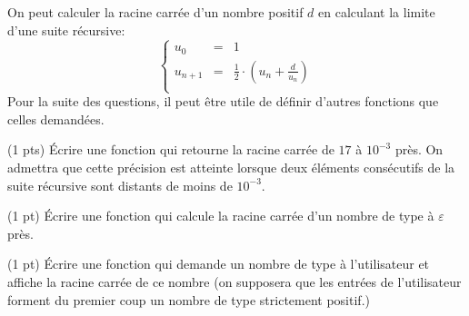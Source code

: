 

On peut calculer la racine carr{\'e}e d'un nombre positif $d$ en calculant
la limite d'une suite r{\'e}cursive:
$$
\left\lbrace
\begin{array}{rcl}
u_0 &=& 1 \\
u_{n+1}&=& \frac 12 \cdot ( u_n + \frac d {u_n} )\\
\end{array}
\right.
$$
Pour la suite des questions, il peut {\^e}tre utile de d{\'e}finir d'autres
fonctions que celles demand{\'e}es.

\question (1 pts) {\'E}crire une fonction  qui
retourne la racine carr{\'e}e de $17$ {\`a} $10^{-3}$ pr{\`e}s. On
admettra que cette pr{\'e}cision est atteinte lorsque deux {\'e}l{\'e}ments
cons{\'e}cutifs de la suite r{\'e}cursive sont distants de moins de $10^{-3}$.

\question (1 pt) {\'E}crire une fonction  qui calcule la racine
  carr{\'e}e d'un nombre de type  {\`a} $\varepsilon$
  pr{\`e}s.

\question (1 pt) {\'E}crire une fonction qui demande un nombre de type
 {\`a} l'utilisateur et affiche la racine carr{\'e}e de
ce nombre (on supposera que les entr{\'e}es de l'utilisateur forment
du premier coup un nombre de type  strictement positif.)

